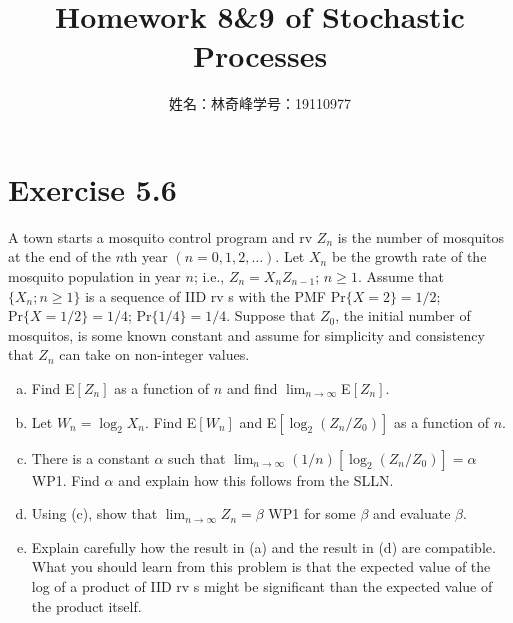 \documentclass{article}
\begin{document}
    \title{Homework 8\&9 of Stochastic Processes}
    \author{姓名：林奇峰\qquad 学号：19110977}
    \maketitle

    \section{Exercise 5.6}
    A town starts a mosquito control program and rv $Z_n$ is the number of mosquitos at the end of the $n$th year $(n=0,1,2,\dots)$. Let $X_n$ be the growth rate of the mosquito population in year $n$; i.e., $Z_n=X_nZ_{n-1}$; $n\geq 1$. Assume that $\{X_n;n\geq 1\}$ is a sequence of IID rv s with the PMF $\text{Pr}\{X=2\}=1/2$; $\text{Pr}\{X=1/2\}=1/4$; $\text{Pr}\{1/4\}=1/4$. Suppose that $Z_0$, the initial number of mosquitos, is some known constant and assume for simplicity and consistency that $Z_n$ can take on non-integer values.
    \begin{enumerate}[(a)]
        \item Find E$[Z_n]$ as a function of $n$ and find $\lim_{n\rightarrow\infty}$E$[Z_n]$.
        \item Let $W_n=\log_2X_n$. Find E$[W_n]$ and E$[\log_2(Z_n/Z_0)]$ as a function of $n$.
        \item There is a constant $\alpha$ such that $\lim_{n\rightarrow\infty}(1/n)[\log_2(Z_n/Z_0)]=\alpha$ WP1. Find $\alpha$ and explain how this follows from the SLLN.
        \item Using (c), show that $\lim_{n\rightarrow\infty}Z_n=\beta$ WP1 for some $\beta$ and evaluate $\beta$.
        \item Explain carefully how the result in (a) and the result in (d) are compatible. What you should learn from this problem is that the expected value of the log of a product of IID rv s might be significant than the expected value of the product itself.
    \end{enumerate}
\end{document}
